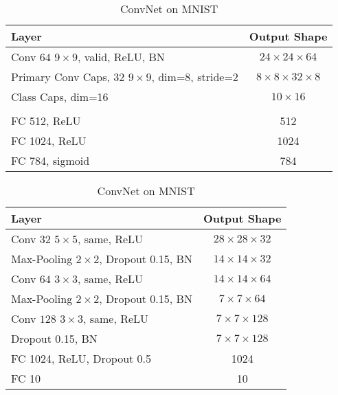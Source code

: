 \begin{table}
	\centering
	
	\begin{tabular}{lc}
		\toprule 
		Layer	&  Output Shape \\ 
		\midrule 
		Conv $64$ $9\times9$, valid, ReLU, BN & $24\times24\times64$ \\ 
		\midrule 
		Primary Conv Caps, $32$ $9\times9$, dim=$8$, stride=2	&  $8\times8\times32\times8$ \\ 
		\midrule 
		Class Caps, dim=16	& $10\times16$ \\ 
		\midrule 
		& \\
		\midrule
		FC 512, ReLU	& 512 \\
		\midrule
		FC 1024, ReLU	& 1024 \\
		\midrule
		FC 784, sigmoid	& 784 \\
		\bottomrule
	\end{tabular} 
	\caption{CapsNet on MNIST}
	\label{tab:capsnet:mnist}

	\vspace{0.75cm}
	
	\begin{tabular}{lc}
		\toprule 
		Layer	&  Output Shape \\ 
		\midrule 
		Conv $32$ $5\times5$, same,	ReLU & $28\times28\times32$ \\ 
		\midrule 
		Max-Pooling $2\times2$, Dropout 0.15, BN	&  $14\times14\times32$ \\ 
		\midrule 
		Conv $64$ $3\times3$, same, ReLU	& $14\times14\times64$ \\ 
		\midrule 
		Max-Pooling $2\times2$, Dropout 0.15, BN	& $7\times7\times64$ \\
		\midrule
		Conv $128$ $3\times3$, same, ReLU	& $7\times7\times128$ \\
		\midrule
		Dropout 0.15, BN	& $7\times7\times128$ \\
		\midrule
		FC 1024, ReLU, Dropout 0.5 & 1024 \\
		\midrule
		FC 10 & 10\\
		\bottomrule
	\end{tabular} 
	\caption{ConvNet on MNIST}
	\label{tab:convnet:mnist}
\end{table}


